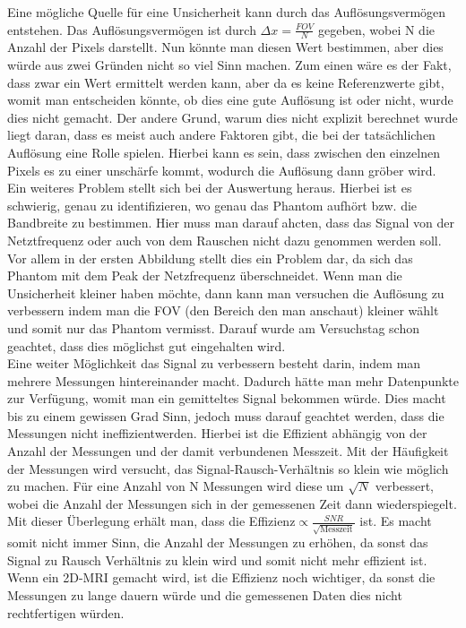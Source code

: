 Eine mögliche Quelle für eine Unsicherheit kann durch das Auflösungsvermögen entstehen. Das Auflösungsvermögen ist durch $\Delta x=\frac{FOV}{N}$ gegeben, wobei N die Anzahl der Pixels darstellt\cite{Schmidt}. Nun könnte man diesen Wert bestimmen, aber dies würde aus zwei Gründen nicht so viel Sinn machen. Zum einen wäre es der Fakt, dass zwar ein Wert ermittelt werden kann, aber da es keine Referenzwerte gibt, womit man entscheiden könnte, ob dies eine gute Auflösung ist oder nicht, wurde dies nicht gemacht. Der andere Grund, warum dies nicht explizit berechnet wurde liegt daran, dass es meist auch andere Faktoren gibt, die bei der tatsächlichen Auflösung eine Rolle spielen. Hierbei kann es sein, dass zwischen den einzelnen Pixels es zu einer unschärfe kommt, wodurch die Auflösung dann gröber wird.\\
Ein weiteres Problem stellt sich bei der Auswertung heraus. Hierbei ist es schwierig, genau zu identifizieren, wo genau das Phantom aufhört bzw. die Bandbreite zu bestimmen. Hier muss man darauf ahcten, dass das Signal von der Netztfrequenz oder auch von dem Rauschen nicht dazu genommen werden soll. Vor allem in der ersten Abbildung stellt dies ein Problem dar, da sich das Phantom mit dem Peak der Netzfrequenz überschneidet.
Wenn man die Unsicherheit kleiner haben möchte, dann kann man versuchen die Auflösung zu verbessern indem man die FOV (den Bereich den man anschaut) kleiner wählt und somit nur das Phantom vermisst. Darauf wurde am Versuchstag schon geachtet, dass dies möglichst gut eingehalten wird. \\
Eine weiter Möglichkeit das Signal zu verbessern besteht darin, indem man mehrere Messungen hintereinander macht. Dadurch hätte man mehr Datenpunkte zur Verfügung, womit man ein gemitteltes Signal bekommen würde. Dies macht bis zu einem gewissen Grad Sinn, jedoch muss darauf geachtet werden, dass die Messungen nicht \glqq ineffizient\grqq werden. Hierbei ist die Effizient abhängig von der Anzahl der Messungen und der damit verbundenen Messzeit. Mit der Häufigkeit der Messungen wird versucht, das Signal-Rausch-Verhältnis so klein wie möglich zu machen. Für eine Anzahl von N Messungen wird diese um $\sqrt{N}$ verbessert, wobei die Anzahl der Messungen sich in der gemessenen Zeit dann wiederspiegelt. Mit dieser Überlegung erhält man, dass die Effizienz$\propto\frac{SNR}{\sqrt{\text{Messzeit}}}$ ist. Es macht somit nicht immer Sinn, die Anzahl der Messungen zu erhöhen, da sonst das Signal zu Rausch Verhältnis zu klein wird und somit nicht mehr effizient ist.
Wenn ein 2D-MRI gemacht wird, ist die Effizienz noch wichtiger, da sonst die Messungen zu lange dauern würde und die gemessenen Daten dies nicht rechtfertigen würden. 